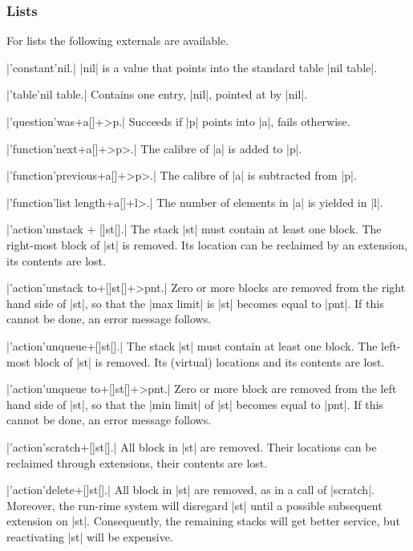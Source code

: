 \documentclass{article}
\newcommand\g[1]{{\sf #1}}
\begin{document}
\subsubsection{Lists}\label{5.2.4}

For lists the following externals are available.

\X\pp|'constant'nil.|\Y
\pp|nil| is a value that points into the standard table \pp|nil table|.

\X\pp|'table'nil table.|\Y
Contains one entry, \pp|nil|, pointed at by \pp|nil|.

\X\pp|'question'was+a[]+>p.|\Y
Succeeds if \pp|p| points into \pp|a|, fails otherwise.

\X\pp|'function'next+a[]+>p>.|\Y
The calibre of \pp|a| is added to \pp|p|.

\X\pp|'function'previous+a[]+>p>.|\Y
The calibre of \pp|a| is subtracted from \pp|p|.

\X\pp|'function'list length+a[]+l>.|\Y
The number of elements in \pp|a| is yielded in \pp|l|.

\X\pp|'action'unstack + []st[].|\Y
The stack \pp|st| must contain at least one block. The right-most block of
\pp|st| is removed. Its location can be reclaimed by an \g{extension}, its
contents are lost.

\X\pp|'action'unstack to+[]st[]+>pnt.|\Y
Zero or more blocks are removed from the right hand side of \pp|st|, so that
the \pp|max limit| is \pp|st| becomes equal to \pp|pnt|. If this cannot be
done, an error message follows.

\X\pp|'action'unqueue+[]st[].|\Y
The stack \pp|st| must contain at least one block. The left-most block of
\pp|st| is removed. Its (virtual) locations and its contents are lost.

\X\pp|'action'unqueue to+[]st[]+>pnt.|\Y
Zero or more block are removed from the left hand side of \pp|st|, so that
the \pp|min limit| of \pp|st|  becomes equal to \pp|pnt|. If this cannot be
done, an error message follows.

\X\pp|'action'scratch+[]st[].|\Y
All block in \pp|st| are removed. Their locations can be reclaimed through
\g{extension}s, their contents are lost.

\X\pp|'action'delete+[]st[].|\Y
All block in \pp|st| are removed, as in a call of \pp|scratch|. Moreover,
the run-rime system will disregard \pp|st| until a possible subsequent
\g{extension} on \pp|st|. Consequently, the remaining stacks will get better
service, but reactivating \pp|st| will be expensive.
\end{document}
